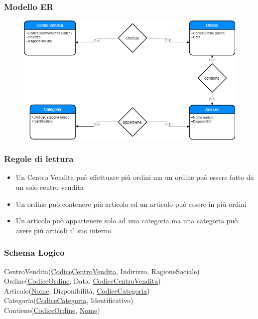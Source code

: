 \documentclass{article}
\begin{document}
	\subsubsection{Modello ER}
	\begin{figure}[h!]
		\centering
		\includegraphics[scale=0.5]{images/Negozio.png}
	\end{figure}
	\subsubsection{Regole di lettura}
	\begin{itemize}
		\item Un Centro Vendita può effettuare più ordini ma un ordine può essere fatto da un solo centro vendita
		\item Un ordine può contenere più articolo ed un articolo può essere in più ordini
		\item Un articolo può appartenere solo ad una categoria ma una categoria può avere più articoli al suo interno
	\end{itemize}
	\subsubsection{Schema Logico}
	CentroVendita(\underline{CodiceCentroVendita}, Indirizzo, RagioneSociale)\\
	Ordine(\underline{CodiceOrdine}, Data, \underline{CodiceCentroVendita})\\
	Articolo(\underline{Nome}, Disponibilità, \underline{CodiceCategoria})\\
	Categoria(\underline{CodiceCategoria}, Identificativo)\\
	Contiene(\underline{CodiceOrdine}, \underline{Nome})
\end{document}
